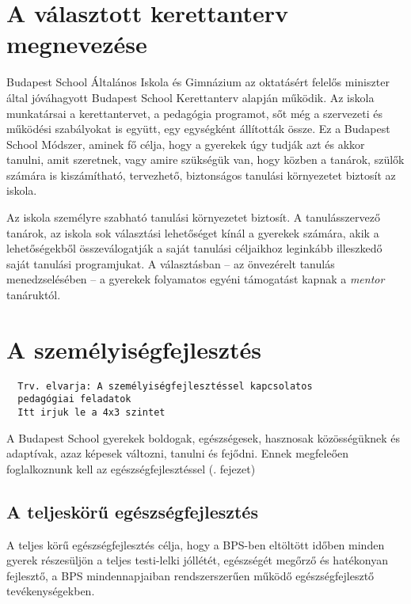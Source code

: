 \section{A választott kerettanterv
  megnevezése}

Budapest School Általános Iskola és Gimnázium az oktatásért felelős
miniszter által jóváhagyott Budapest School Kerettanterv alapján
működik. Az iskola munkatársai a kerettantervet, a pedagógia programot,
sőt még a szervezeti és működési szabályokat is együtt, egy egységként
állították össze. Ez a Budapest School Módszer, aminek fő célja, hogy a
gyerekek úgy tudják azt és akkor tanulni, amit szeretnek, vagy amire
szükségük van, hogy közben a tanárok, szülők számára is kiszámítható,
tervezhető, biztonságos tanulási környezetet biztosít az iskola.

Az iskola személyre szabható tanulási környezetet biztosít. A
tanulásszervező tanárok, az iskola sok választási lehetőséget kínál a
gyerekek számára, akik a lehetőségekből összeválogatják a saját tanulási
céljaikhoz leginkább illeszkedő saját tanulási programjukat. A
választásban -- az önvezérelt tanulás menedzselésében -- a gyerekek
folyamatos egyéni támogatást kapnak a \emph{mentor} tanáruktól.

\section{A személyiségfejlesztés}
\label{sec:szemilyesegfejlesztes}
\begin{verbatim}
  Trv. elvarja: A személyiségfejlesztéssel kapcsolatos
  pedagógiai feladatok
  Itt irjuk le a 4x3 szintet
\end{verbatim}

A Budapest School gyerekek boldogak, egészségesek, hasznosak közösségüknek és
adaptívak, azaz képesek változni, tanulni és fejődni. Ennek megfeleően
foglalkoznunk kell az egészségfejlesztéssel (.
fejezet)

\subsection{A teljeskörű
      egészségfejlesztés}\label{sec:egeszsegfejlesztes}


A teljes körű egészségfejlesztés célja, hogy a BPS-ben eltöltött időben
minden gyerek részesüljön a teljes testi-lelki jóllétét, egészségét
megőrző és hatékonyan fejlesztő, a BPS mindennapjaiban rendszerszerűen
működő egészségfejlesztő tevékenységekben.


